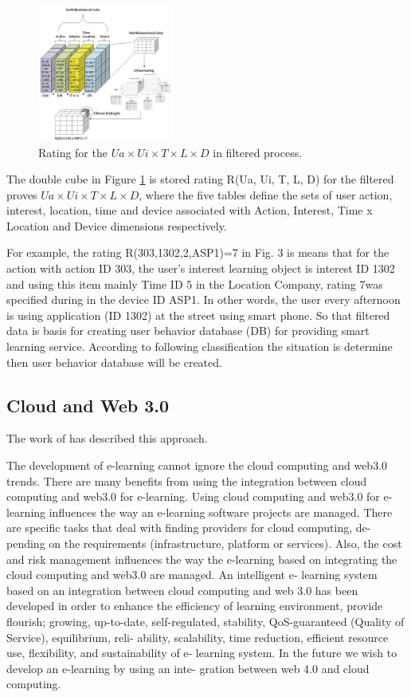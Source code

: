 \documentclass[journal]{vgtc}                %
\begin{document}
  \begin{figure}[htb]
    \centering
    \includegraphics[width=0.4\textwidth]{rating}
    \caption{Rating for the $Ua \times Ui \times T \times L \times D$ in filtered process\cite{Kim2013}.}
    \label{rating}
  \end{figure}

  The double cube in Figure \ref{rating} is stored rating R(Ua, Ui, T, L, D) for the filtered proves $Ua \times Ui \times T \times L \times D$, where the five tables define the sets of user action, interest, location, time and device associated with Action, Interest, Time x Location and Device dimensions respectively.

  For example, the rating R(303,1302,2,ASP1)=7 in Fig. 3 is means that for the action with action ID 303, the user's interest learning object is interest ID 1302 and using this item mainly Time ID 5 in the Location Company, rating 7was specified during in the device ID ASP1. In other words, the user every afternoon is using application (ID 1302) at the street using smart phone. So that filtered data is basis for creating user behavior database (DB) for providing smart learning service. According to following classification the situation is determine then user behavior database will be created.

  
  \subsection{Cloud and Web 3.0}
  The work of \cite{nasr2012proposed} has described this approach.

  The development of e-learning cannot ignore the cloud computing and web3.0 trends. There are many benefits from using the integration between cloud computing and web3.0 for e-learning. Using cloud computing and web3.0 for e-learning influences the way an e-learning software projects are managed. There are specific tasks that deal with finding providers for cloud computing, de- pending on the requirements (infrastructure, platform or services). Also, the cost and risk management influences the way the e-learning based on integrating the cloud computing and web3.0 are managed. An intelligent e- learning system based on an integration between cloud computing and web 3.0 has been developed in order to enhance the efficiency of learning environment, provide flourish; growing, up-to-date, self-regulated, stability, QoS-guaranteed (Quality of Service), equilibrium, reli- ability, scalability, time reduction, efficient resource use, flexibility, and sustainability of e- learning system. In the future we wish to develop an e-learning by using an inte- gration between web 4.0 and cloud computing.
\end{document}
